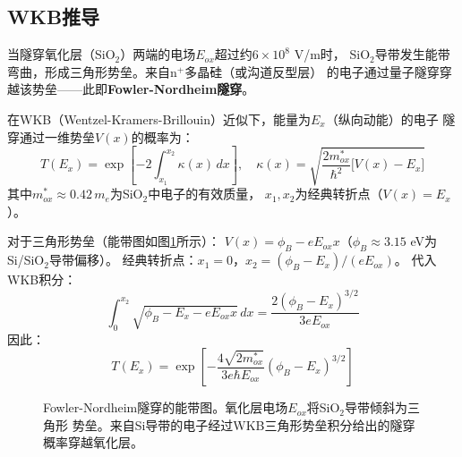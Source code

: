 \documentclass[11pt,a4paper,openany]{book}
\theoremstyle{definition}
\theoremstyle{plain}
\theoremstyle{remark}
\begin{document}
\subsection{WKB推导}

当隧穿氧化层（SiO$_2$）两端的电场$E_{ox}$超过约$6 \times 10^8$ V/m时，
SiO$_2$导带发生能带弯曲，形成三角形势垒。来自n$^+$多晶硅（或沟道反型层）
的电子通过量子隧穿穿越该势垒——此即\textbf{Fowler-Nordheim隧穿}。

在WKB（Wentzel-Kramers-Brillouin）近似下，能量为$E_x$（纵向动能）的电子
隧穿通过一维势垒$V(x)$的概率为：
\begin{equation}\label{eq:wkb}
  T(E_x) = \exp\!\left[ -2\int_{x_1}^{x_2} \kappa(x)\,dx \right],\quad
  \kappa(x) = \sqrt{\frac{2m^*_{ox}}{\hbar^2}\bigl[V(x) - E_x\bigr]}
\end{equation}
其中$m^*_{ox} \approx 0.42\,m_e$为SiO$_2$中电子的有效质量，
$x_1, x_2$为经典转折点（$V(x) = E_x$）。

对于三角形势垒（能带图如图\ref{fig:fn-barrier}所示）：
$V(x) = \phi_B - eE_{ox}x$（$\phi_B \approx 3.15$ eV为Si/SiO$_2$导带偏移）。
经典转折点：$x_1 = 0$，$x_2 = (\phi_B - E_x)/(eE_{ox})$。
代入WKB积分：
\begin{equation}
  \int_0^{x_2} \sqrt{\phi_B - E_x - eE_{ox}x}\,dx
  = \frac{2(\phi_B - E_x)^{3/2}}{3eE_{ox}}
\end{equation}
因此：
\begin{equation}
  T(E_x) = \exp\!\left[ -\frac{4\sqrt{2m^*_{ox}}}{3e\hbar E_{ox}}
            (\phi_B - E_x)^{3/2} \right]
\end{equation}

\begin{figure}[htbp]
\centering
{}
\caption{Fowler-Nordheim隧穿的能带图。氧化层电场$E_{ox}$将SiO$_2$导带倾斜为三角形
势垒。来自Si导带的电子经过WKB三角形势垒积分给出的隧穿概率穿越氧化层。}
\label{fig:fn-barrier}
\end{figure}
\end{document}
